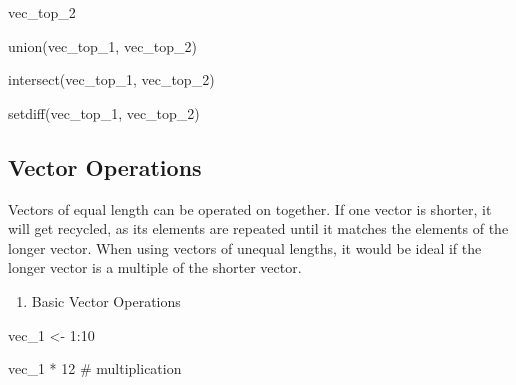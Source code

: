 \documentclass[
  letterpaper,
  DIV=11,
  numbers=noendperiod]{scrreprt}
\newenvironment{Shaded}{}{}
\newcommand{\CommentTok}[1]{\textcolor[rgb]{0.42,0.45,0.49}{#1}}
\newcommand{\DecValTok}[1]{\textcolor[rgb]{0.00,0.36,0.77}{#1}}
\newcommand{\FunctionTok}[1]{\textcolor[rgb]{0.44,0.26,0.76}{#1}}
\newcommand{\NormalTok}[1]{\textcolor[rgb]{0.14,0.16,0.18}{#1}}
\newcommand{\OtherTok}[1]{\textcolor[rgb]{0.44,0.26,0.76}{#1}}
\newcommand{\SpecialCharTok}[1]{\textcolor[rgb]{0.00,0.36,0.77}{#1}}
\providecommand{\tightlist}{%
  \setlength{\itemsep}{0pt}\setlength{\parskip}{0pt}}\usepackage{longtable,booktabs,array}
\begin{document}
\begin{Shaded}
\begin{Highlighting}[]
\NormalTok{vec\_top\_2}
\end{Highlighting}
\end{Shaded}

\begin{Shaded}
\begin{Highlighting}[]
\FunctionTok{union}\NormalTok{(vec\_top\_1, vec\_top\_2)}
\end{Highlighting}
\end{Shaded}

\begin{Shaded}
\begin{Highlighting}[]
\FunctionTok{intersect}\NormalTok{(vec\_top\_1, vec\_top\_2)}
\end{Highlighting}
\end{Shaded}

\begin{Shaded}
\begin{Highlighting}[]
\FunctionTok{setdiff}\NormalTok{(vec\_top\_1, vec\_top\_2)}
\end{Highlighting}
\end{Shaded}

\subsection{Vector Operations}\label{vector-operations}

Vectors of equal length can be operated on together. If one vector is
shorter, it will get recycled, as its elements are repeated until it
matches the elements of the longer vector. When using vectors of unequal
lengths, it would be ideal if the longer vector is a multiple of the
shorter vector.

\begin{enumerate}
\def\labelenumi{\arabic{enumi}.}
\tightlist
\item
  Basic Vector Operations
\end{enumerate}

\begin{Shaded}
\begin{Highlighting}[]
\NormalTok{vec\_1 }\OtherTok{\textless{}{-}} \DecValTok{1}\SpecialCharTok{:}\DecValTok{10}
\end{Highlighting}
\end{Shaded}

\begin{Shaded}
\begin{Highlighting}[]
\NormalTok{vec\_1 }\SpecialCharTok{*} \DecValTok{12} \CommentTok{\# multiplication}
\end{Highlighting}
\end{Shaded}
\end{document}
